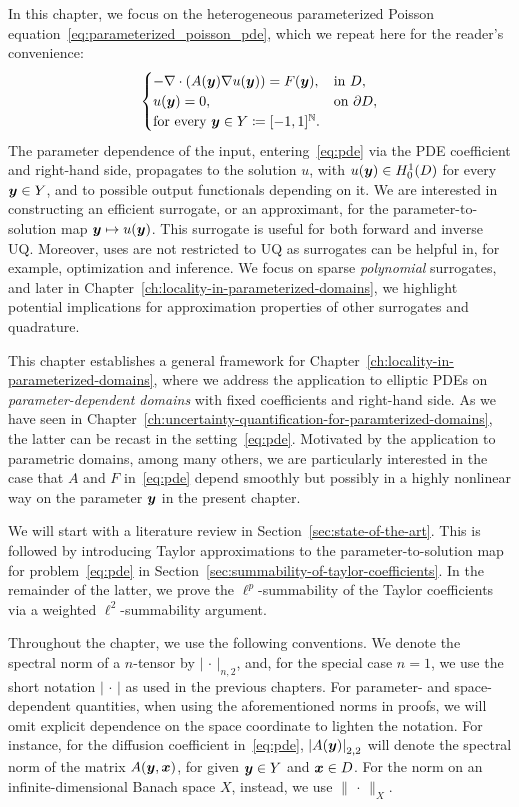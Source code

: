 In this chapter, we focus on the heterogeneous parameterized Poisson equation~\eqref{eq:parameterized_poisson_pde}, which we repeat here for the reader's convenience:
\begin{equation}
    \begin{cases}
        -\nabla\cdot\left(A({\bm{y}})\nabla u({\bm{y}}) \right) = F({\bm{y}}), & \text{in } D,\\
        u({\bm{y}}) = 0, & \text{on } \partial D,\\
        \text{for every }\bm{y} \in Y \coloneqq [-1, 1]^\mathbb{N}.
    \end{cases} \label{eq:pde}
\end{equation}
The parameter dependence of the input, entering~\eqref{eq:pde} via the PDE coefficient and right-hand side, propagates to the solution $u$, with $u({\bm{y}})\in H_0^1(D)$ for every ${\bm{y}}\in Y$, and to possible output functionals depending on it.
We are interested in constructing an efficient surrogate, or an approximant, for the parameter-to-solution map ${\bm{y}} \mapsto u({\bm{y}})$.
This surrogate is useful for both forward and inverse UQ.
Moreover, uses are not restricted to UQ as surrogates can be helpful in, for example, optimization and inference.
We focus on sparse \textsl{polynomial} surrogates, and later in Chapter~\ref{ch:locality-in-parameterized-domains}, we highlight potential implications for approximation properties of other surrogates and quadrature.

This chapter establishes a general framework for Chapter~\ref{ch:locality-in-parameterized-domains}, where we address the application to elliptic PDEs on \textsl{parameter-dependent domains} with fixed coefficients and right-hand side.
As we have seen in Chapter~\ref{ch:uncertainty-quantification-for-paramterized-domains}, the latter can be recast in the setting~\eqref{eq:pde}.
Motivated by the application to parametric domains, among many others, we are particularly interested in the case that $A$ and $F$ in~\eqref{eq:pde} depend smoothly but possibly in a highly nonlinear way on the parameter ${\bm{y}}$ in the present chapter.

We will start with a literature review in Section~\ref{sec:state-of-the-art}.
This is followed by introducing Taylor approximations to the parameter-to-solution map for problem~\eqref{eq:pde} in Section~\ref{sec:summability-of-taylor-coefficients}.
In the remainder of the latter, we prove the $\ell^p$-summability of the Taylor coefficients via a weighted $\ell^2$-summability argument.

Throughout the chapter, we use the following conventions.
We denote the spectral norm of a $n$-tensor by $\left|\,\cdot\,\right|_{n,2}$, and, for the special case $n=1$, we use the short notation $\left|\,\cdot\,\right|$ as used in the previous chapters.
For parameter- and space-dependent quantities, when using the aforementioned norms in proofs, we will omit explicit dependence on the space coordinate to lighten the notation.
For instance, for the diffusion coefficient in~\eqref{eq:pde}, $\left|A({\bm{y}})\right|_{2,2}$ will denote the spectral norm of the matrix $A({\bm{y}},{{\bm{x}}})$, for given ${\bm{y}}\in Y$ and ${{\bm{x}}}\in D$.
For the norm on an infinite-dimensional Banach space $X$, instead, we use $\lVert\,\cdot\,\rVert_X$.